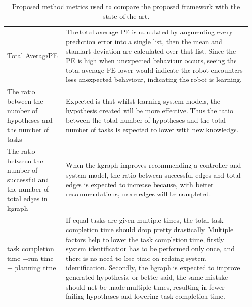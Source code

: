 \noindent
\begin{table}[H]
\centering
\begin{tabular}%
  {>{\raggedright\arraybackslash}p{}%
   >{\raggedright\arraybackslash}p{}}
Total Average\newline \acl{PE} & The total average \ac{PE} is calculated by augmenting every prediction error into a single list, then the mean and standart deviation are calculated over that list. Since the \ac{PE} is high when unexpected behaviour occurs, seeing the total average \ac{PE} lower would indicate the robot encounters less unexpected behaviour, indicating the robot is learning.\\
The ratio between the number of hypotheses and the number of tasks & Expected is that whilst learning system models, the hypothesis created will be more effective. Thus the ratio between the total number of hypotheses and the total number of tasks is expected to lower with new knowledge.\\
The ratio between the number of successful and the number of total edges in \ac{kgraph} & When the \ac{kgraph} improves recommending a controller and system model, the ratio between successful edges and total edges is expected to increase because, with better recommendations, more edges will be completed.\\
task completion time =\newline run time + planning time& If equal tasks are given multiple times, the total task completion time should drop pretty drastically. Multiple factors help to lower the task completion time, firstly system identification has to be performed only once, and there is no need to lose time on redoing system identification. Secondly, the \ac{hgraph} is expected to improve generated hypothesis, or better said, the same mistake should not be made multiple times, resulting in fewer failing hypotheses and lowering task completion time.\\
\end{tabular}
\caption{Proposed method metrics used to compare the proposed framework with the state-of-the-art.}\label{table:proposed_method_metrics}
\end{table}

